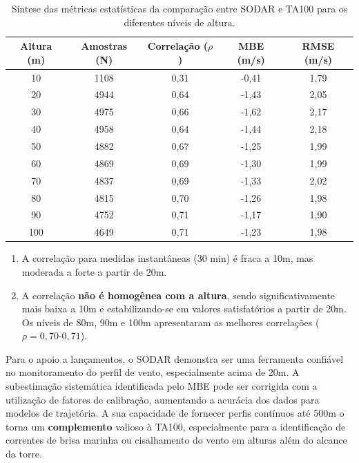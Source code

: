 \documentclass[12pt, a4paper, twocolumn]{article}
\begin{document}
\begin{table}[bp]
\centering
\caption{Síntese das métricas estatísticas da comparação entre SODAR e TA100 para os diferentes níveis de altura.}
\label{tab:resultados}
\begin{tabular}{@{}ccccc@{}}
\toprule
Altura (m) & Amostras (N) & Correlação ($\rho$) & MBE (m/s) & RMSE (m/s) \\ \midrule
10         & 1108          & 0,31           & -0,41             & 1,79       \\
20         & 4944          & 0,64           & -1,43             & 2,05       \\
30         & 4975          & 0,66           & -1,62             & 2,17       \\
40         & 4958          & 0,64           & -1,44             & 2,18       \\
50         & 4882          & 0,67           & -1,25             & 1,99       \\
60         & 4869          & 0,69           & -1,30             & 1,99       \\
70         & 4837          & 0,69           & -1,33             & 2,02       \\
80         & 4815          & 0,70           & -1,26             & 1,98       \\
90         & 4752          & 0,71           & -1,17             & 1,90       \\
100        & 4649          & 0,71           & -1,23             & 1,98       \\ \bottomrule
\end{tabular}
\end{table}


\begin{enumerate}
    \item A correlação para medidas instantâneas (30 min) é fraca a 10m, mas moderada a forte a partir de 20m.
    \item A correlação \textbf{não é homogênea com a altura}, sendo significativamente mais baixa a 10m e estabilizando-se em valores satisfatórios a partir de 20m. Os níveis de 80m, 90m e 100m apresentaram as melhores correlações ($\rho=0,70$-$0,71$).
\end{enumerate}

Para o apoio a lançamentos, o SODAR demonstra ser uma ferramenta confiável no monitoramento do perfil de vento, especialmente acima de 20m. A subestimação sistemática identificada pelo MBE pode ser corrigida com a utilização de fatores de calibração, aumentando a acurácia dos dados para modelos de trajetória. A sua capacidade de fornecer perfis contínuos até 500m o torna um \textbf{complemento} valioso à TA100, especialmente para a identificação de correntes de brisa marinha ou cisalhamento do vento em alturas além do alcance da torre.
\end{document}
